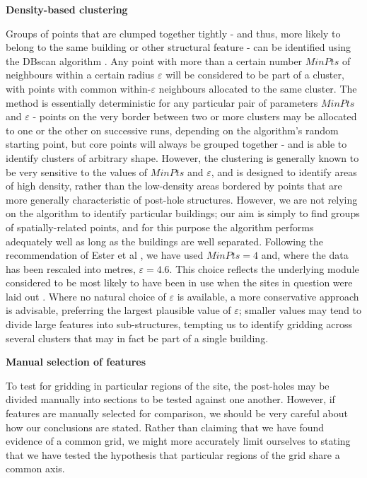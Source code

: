 \documentclass[../../ArchStats.tex]{subfiles}
\begin{document}

\textbf{Density-based clustering}

Groups of points that are clumped together tightly - and thus, more likely to belong to the same building or other structural feature - can be identified using the DBscan algorithm \cite{Ester1996}. Any point with more than a certain number $MinPts$ of neighbours within a certain radius $\varepsilon$ will be considered to be part of a cluster, with points with common within-$\varepsilon$ neighbours allocated to the same cluster. The method is essentially deterministic for any particular pair of parameters $MinPts$ and $\varepsilon$ - points on the very border between two or more clusters may be allocated to one or the other on successive runs, depending on the algorithm's random starting point, but core points will always be grouped together - and is able to identify clusters of arbitrary shape. However, the clustering is generally known to be very sensitive to the values of $MinPts$ and $\varepsilon$, and is designed to identify areas of high density, rather than the low-density areas bordered by points that are more generally characteristic of post-hole structures. However, we are not relying on the algorithm to identify particular buildings; our aim is simply to find groups of spatially-related points, and for this purpose the algorithm performs adequately well as long as the buildings are well separated. Following the recommendation of Ester et al \cite{Ester1996}, we have used $MinPts = 4$ and, where the data has been rescaled into metres, $\varepsilon = 4.6$. This choice reflects the underlying module considered to be most likely to have been in use when the sites in question were laid out  \cite{Blair2013}. Where no natural choice of $\varepsilon$ is available, a more conservative approach is advisable, preferring the largest plausible value of $\varepsilon$; smaller values may tend to divide large features into sub-structures, tempting us to identify gridding across several clusters that may in fact be part of a single building. 


\textbf{Manual selection of features}

To test for gridding in particular regions of the site, the post-holes may be divided manually into sections to be tested against one another. However, if features are manually selected for comparison, we should be very careful about how our conclusions are stated. Rather than claiming that we have found evidence of a common grid, we might more accurately limit ourselves to stating that we have tested the hypothesis that particular regions of the grid share a common axis.
\end{document}
